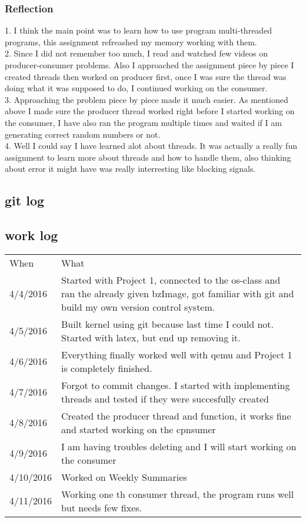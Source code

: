 \documentclass[letterpaper,10pt,draftclsnofoot,onecolumn]{IEEEtran}
\begin{document}
\subsubsection*{Reflection}
	1. I think the main point was to learn how to use program multi-threaded programs, this assignment refreashed my memory working with them.\\
	2. Since I did not remember too much, I read and watched few videos on producer-consumer problems. Also I approached the assignment piece by piece I created threads then worked on producer first, once I was sure the thread was doing what it was supposed to do, I continued working on the consumer.\\
	3. Approaching the problem piece by piece made it much easier. As mentioned above I made sure the producer thread worked right before I started working on the consumer, I have also ran the program multiple times and waited if I am generating correct random numbers or not.\\
	4. Well I could say I have learned alot about threads. It was actually a really fun assignment to learn more about threads and how to handle them, also thinking about error it might have was really interresting like blocking signals.\\

\subsection*{git log}

\subsection*{work log}
\begin{center}
\begin{tabular}{ |m{2cm}|m{5cm}| }
\hline
When & What \\
4/4/2016 & Started with Project 1, connected to the os-class and ran the already given bzImage, got familiar with git and build my own version control system.\\
4/5/2016 & Built kernel using git because last time I could not. Started with latex, but end up removing it.\\
4/6/2016 & Everything finally worked well with qemu and Project 1 is completely finished.\\
4/7/2016 & Forgot to commit changes. I started with implementing threads and tested if they were succesfully created\\
4/8/2016 & Created the producer thread and function, it works fine and started working on the cpnsumer\\
4/9/2016 & I am having troubles deleting and I will start working on the consumer\\
4/10/2016 & Worked on Weekly Summaries\\
4/11/2016 & Working one th consumer thread, the program runs well but needs few fixes. \\
\hline
\end{tabular}
\end{center}
\end{document}
